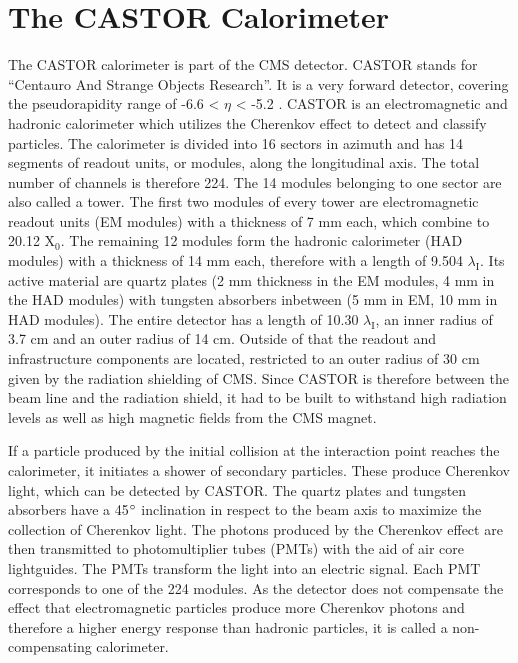 \section{The CASTOR Calorimeter}

The CASTOR calorimeter is part of the CMS detector. CASTOR stands for \enquote{Centauro And Strange Objects Research}. It is a very forward detector, covering the pseudorapidity range of -6.6 < $\eta$ < -5.2 . CASTOR is an electromagnetic and hadronic calorimeter which utilizes the Cherenkov effect to detect and classify particles. The calorimeter is divided into 16 sectors in azimuth and has 14 segments of readout units, or modules, along the longitudinal axis. The total number of channels is therefore 224. The 14 modules belonging to one sector are also called a tower.
The first two modules of every tower are electromagnetic readout units (EM modules) with a thickness of 7 mm each, which combine to 20.12 X$_0$. The remaining 12 modules form the hadronic calorimeter (HAD modules) with a thickness of 14 mm each, therefore with a length of 9.504 $\lambda_{\mathrm{I}}$. 
Its active material are quartz plates (2 mm thickness in the EM modules, 4 mm in the HAD modules) with tungsten absorbers inbetween (5 mm in EM, 10 mm in HAD modules). The entire detector has a length of 10.30 $\lambda_{\mathrm{I}}$, an inner radius of 3.7 cm and an outer radius of 14 cm. Outside of that the readout and infrastructure components are located, restricted to an outer radius of 30 cm given by the radiation shielding of CMS. Since CASTOR is therefore between the beam line and the radiation shield, it had to be built to withstand high radiation levels as well as high magnetic fields from the CMS magnet. 



If a particle produced by the initial collision at the interaction point reaches the calorimeter, it initiates a shower of secondary particles. These produce Cherenkov light, which can be detected by CASTOR. The quartz plates and tungsten absorbers have a 45$\degree$ inclination in respect to the beam axis to maximize the collection of Cherenkov light. The photons produced by the Cherenkov effect are then transmitted to photomultiplier tubes (PMTs) with the aid of air core lightguides. The PMTs transform the light into an electric signal. Each PMT corresponds to one of the 224 modules.
As the detector does not compensate the effect that electromagnetic particles produce more Cherenkov photons and therefore a higher energy response than hadronic particles, it is called a non-compensating calorimeter.



